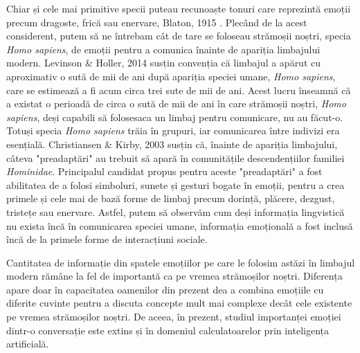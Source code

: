 \documentclass[a4paper,12pt]{book}
\begin{document}
				Chiar și cele mai primitive specii puteau recunoaște tonuri care reprezintă emoții precum dragoste, frică sau enervare, Blaton, 1915 \cite{blanton}. Plecând de la acest considerent, putem să ne întrebam cât de tare se foloseau strămoșii noștri, specia \textit{Homo sapiens}, de emoții pentru a comunica înainte de apariția limbajului modern.  Levinson \& Holler, 2014 \cite{leviholler} susțin convenția că limbajul a apărut cu aproximativ o sută de mii de ani după apariția speciei umane, \textit{Homo sapiens}, care se estimează a fi acum circa trei sute de mii de ani. Acest lucru înseamnă că a existat o perioadă de circa o sută de mii de ani în care strămoșii noștri, \textit{Homo sapiens}, deși capabili să folosesaca un limbaj pentru comunicare, nu au făcut-o. Totuși specia \textit{Homo sapiens} trăia în grupuri, iar comunicarea între indivizi era esențială. Christiansen \& Kirby, 2003 \cite{chriskirbi} susțin că, înainte de apariția limbajului, câteva "preadaptări" au trebuit să apară în comunitățile descendențiilor familiei \textit{Hominidae}. Principalul candidat propus pentru aceste "preadaptări" a fost abilitatea de a folosi simboluri, sunete și gesturi bogate în emoții, pentru a crea primele și cele mai de bază forme de limbaj precum dorință, plăcere, dezgust, tristețe sau enervare. Astfel, putem să observăm cum deși informația lingvistică nu exista încă în comunicarea speciei umane, informația emoțională a fost inclusă încă de la primele forme de interacțiuni sociale.  \par					
				
				Cantitatea de informație din spatele emoțiilor pe care le folosim astăzi în limbajul modern rămâne la fel de importantă ca pe vremea strămoșilor noștri. Diferența apare doar în capacitatea oamenilor din prezent dea a combina emoțiile cu diferite cuvinte pentru a discuta concepte mult mai complexe decât cele existente pe vremea strămoșilor noștri. De aceea, în prezent, studiul importanței emoției dintr-o conversație este extins și în domeniul calculatoarelor prin inteligența artificială. \par 	
				
\end{document}
